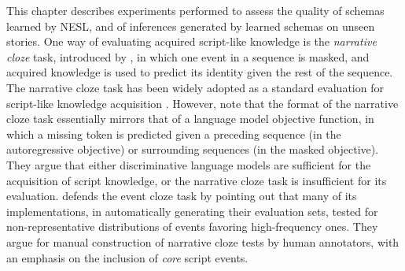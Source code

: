 This chapter describes experiments performed to assess the quality of schemas learned by NESL, and of inferences generated by learned schemas on unseen stories.
One way of evaluating acquired script-like knowledge is the \textit{narrative cloze} task, introduced by \citet{chambers2008unsupervised}, in which one event in a sequence is masked, and acquired knowledge is used to predict its identity given the rest of the sequence.
The narrative cloze task has been widely adopted as a standard evaluation for script-like knowledge acquisition \citep{jans-etal-2012-skip,rudinger-etal-2015-learning,pichotta2016learning,lee-goldwasser-2019-multi}.
However, \citet{rudinger-etal-2015-learning} note that the format of the narrative cloze task essentially mirrors that of a language model objective function, in which a missing token is predicted given a preceding sequence (in the autoregressive objective) or surrounding sequences (in the masked objective).
They argue that either discriminative language models are sufficient for the acquisition of script knowledge, or the narrative cloze task is insufficient for its evaluation.
\citet{chambers-2017-behind} defends the event cloze task by pointing out that many of its implementations, in automatically generating their evaluation sets, tested for non-representative distributions of events favoring high-frequency ones.
They argue for manual construction of narrative cloze tests by human annotators, with an emphasis on the inclusion of \textit{core} script events.

